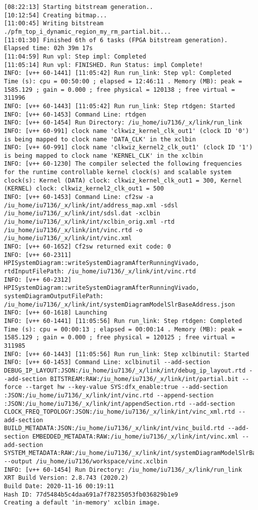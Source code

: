 \begin{lstlisting}[label=lst:code_2,caption=Содержимое файла  v++*.log]
[08:22:13] Starting bitstream generation..
[10:12:54] Creating bitmap...
[11:00:45] Writing bitstream ./pfm_top_i_dynamic_region_my_rm_partial.bit...
[11:01:30] Finished 6th of 6 tasks (FPGA bitstream generation). Elapsed time: 02h 39m 17s 
[11:04:59] Run vpl: Step impl: Completed
[11:05:14] Run vpl: FINISHED. Run Status: impl Complete!
INFO: [v++ 60-1441] [11:05:42] Run run_link: Step vpl: Completed
Time (s): cpu = 00:50:00 ; elapsed = 12:46:11 . Memory (MB): peak = 1585.129 ; gain = 0.000 ; free physical = 120138 ; free virtual = 311996
INFO: [v++ 60-1443] [11:05:42] Run run_link: Step rtdgen: Started
INFO: [v++ 60-1453] Command Line: rtdgen
INFO: [v++ 60-1454] Run Directory: /iu_home/iu7136/_x/link/run_link
INFO: [v++ 60-991] clock name 'clkwiz_kernel_clk_out1' (clock ID '0') is being mapped to clock name 'DATA_CLK' in the xclbin
INFO: [v++ 60-991] clock name 'clkwiz_kernel2_clk_out1' (clock ID '1') is being mapped to clock name 'KERNEL_CLK' in the xclbin
INFO: [v++ 60-1230] The compiler selected the following frequencies for the runtime controllable kernel clock(s) and scalable system clock(s): Kernel (DATA) clock: clkwiz_kernel_clk_out1 = 300, Kernel (KERNEL) clock: clkwiz_kernel2_clk_out1 = 500
INFO: [v++ 60-1453] Command Line: cf2sw -a /iu_home/iu7136/_x/link/int/address_map.xml -sdsl /iu_home/iu7136/_x/link/int/sdsl.dat -xclbin /iu_home/iu7136/_x/link/int/xclbin_orig.xml -rtd /iu_home/iu7136/_x/link/int/vinc.rtd -o /iu_home/iu7136/_x/link/int/vinc.xml
INFO: [v++ 60-1652] Cf2sw returned exit code: 0
INFO: [v++ 60-2311] HPISystemDiagram::writeSystemDiagramAfterRunningVivado, rtdInputFilePath: /iu_home/iu7136/_x/link/int/vinc.rtd
INFO: [v++ 60-2312] HPISystemDiagram::writeSystemDiagramAfterRunningVivado, systemDiagramOutputFilePath: /iu_home/iu7136/_x/link/int/systemDiagramModelSlrBaseAddress.json
INFO: [v++ 60-1618] Launching 
INFO: [v++ 60-1441] [11:05:56] Run run_link: Step rtdgen: Completed
Time (s): cpu = 00:00:13 ; elapsed = 00:00:14 . Memory (MB): peak = 1585.129 ; gain = 0.000 ; free physical = 120125 ; free virtual = 311985
INFO: [v++ 60-1443] [11:05:56] Run run_link: Step xclbinutil: Started
INFO: [v++ 60-1453] Command Line: xclbinutil --add-section DEBUG_IP_LAYOUT:JSON:/iu_home/iu7136/_x/link/int/debug_ip_layout.rtd --add-section BITSTREAM:RAW:/iu_home/iu7136/_x/link/int/partial.bit --force --target hw --key-value SYS:dfx_enable:true --add-section :JSON:/iu_home/iu7136/_x/link/int/vinc.rtd --append-section :JSON:/iu_home/iu7136/_x/link/int/appendSection.rtd --add-section CLOCK_FREQ_TOPOLOGY:JSON:/iu_home/iu7136/_x/link/int/vinc_xml.rtd --add-section BUILD_METADATA:JSON:/iu_home/iu7136/_x/link/int/vinc_build.rtd --add-section EMBEDDED_METADATA:RAW:/iu_home/iu7136/_x/link/int/vinc.xml --add-section SYSTEM_METADATA:RAW:/iu_home/iu7136/_x/link/int/systemDiagramModelSlrBaseAddress.json --output /iu_home/iu7136/workspace/vinc.xclbin
INFO: [v++ 60-1454] Run Directory: /iu_home/iu7136/_x/link/run_link
XRT Build Version: 2.8.743 (2020.2)
Build Date: 2020-11-16 00:19:11
Hash ID: 77d5484b5c4daa691a7f78235053fb036829b1e9
Creating a default 'in-memory' xclbin image.


\end{lstlisting}
